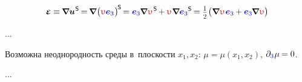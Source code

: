 \begin{otherlanguage}{russian}
\nopagebreak\vspace{-0.33em}\begin{equation*}
\mathboldepsilon \equiv
\hspace{-0.1ex} \boldnabla {\bm{u}}^{\hspace{.1ex}\mathsf{S}} \hspace{-0.2ex}
= \hspace{-0.2ex} \boldnabla \hspace{.1ex} \bigl( \antiplanedisplacement \mathcolor{blue}{\bm{e}_3} \hspace{.1ex} \bigr)^{\hspace{-0.2ex}\mathsf{S}} \hspace{-0.25ex}
= \mathcolor{blue}{\bm{e}_3} \hspace{-0.12ex} \boldnabla \hspace{.1ex} \antiplanedisplacement^{\hspace{.2ex}\mathsf{S}} \hspace{-0.25ex}
+ \antiplanedisplacement \hspace{.1ex} \tikzmark{beginZero2} \boldnabla \mathcolor{blue}{\bm{e}_3}\tikzmark{endZero2}^{\mathsf{S}} \hspace{-0.2ex}
= \smalldisplaystyleonehalf \hspace{.1ex} \bigl( \boldnabla \hspace{.1ex} \antiplanedisplacement \hspace{.2ex} \mathcolor{blue}{\bm{e}_3} \hspace{-0.1ex} + \mathcolor{blue}{\bm{e}_3} \hspace{-0.2ex} \boldnabla \hspace{.1ex} \antiplanedisplacement \bigr)
\end{equation*}%
%

...

Возможна неоднородность среды в~плоскости ${x_1, x_2}$: ${\mu \!=\! \mu(x_1, x_2)}$, ${\partial_{\mathcolor{blue}{3}} \hspace{.1ex} \mu \hspace{-0.1ex} = 0}$.

...



\end{otherlanguage}


